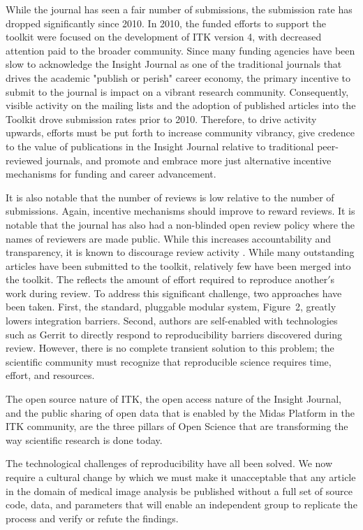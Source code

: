 \documentclass{frontiersENG} %
\begin{document}
While the journal has seen a fair number of submissions, the submission rate
has dropped significantly since 2010. In 2010, the funded efforts to support
the toolkit were focused on the development of ITK version 4, with decreased
attention paid to the broader community.  Since many funding agencies have been
slow to acknowledge the Insight Journal as one of the traditional journals
that drives the academic "publish or perish" career economy, the primary
incentive to submit to the journal is impact on a vibrant research community.
Consequently, visible activity on the mailing lists and the adoption of published
articles into the Toolkit drove submission rates prior to 2010. Therefore, to
drive activity upwards, efforts must be put forth to increase community
vibrancy, give credence to the value of publications in the Insight Journal
relative to traditional peer-reviewed journals, and promote and embrace more
just alternative incentive mechanisms for funding and career advancement.

It is also notable that the number of reviews is low relative to the number of
submissions. Again, incentive mechanisms should improve to reward reviews.  It
is notable that the journal has also had a non-blinded open review policy
where the names of reviewers are made public. While this increases
accountability and transparency, it is known to discourage review activity
\cite{Rooyen1999,Walsh2000}. While many outstanding articles have been
submitted to the toolkit, relatively few have been merged into the toolkit.
The reflects the amount of effort required to reproduce another$'$s work
during review.  To address this significant challenge, two approaches have been
taken.  First, the standard, pluggable modular system,
Figure~2, greatly lowers integration barriers.
Second, authors are self-enabled with technologies such as Gerrit to directly respond
to reproducibility barriers discovered during review. However, there is no
complete transient solution to this
problem; the scientific community must recognize that reproducible science
requires time, effort, and resources.

The open source nature of ITK, the open access nature of the Insight Journal,
and the public sharing of open data that is enabled by the Midas Platform in
the ITK community, are the three pillars of Open Science that are transforming
the way scientific research is done today.

The technological challenges of reproducibility have all been solved. We now
require a cultural change by which we must make it unacceptable that any
article in the domain of medical image analysis be published without a full
set of source code, data, and parameters that will enable an independent group
to replicate the process and verify or refute the findings.
\end{document}
